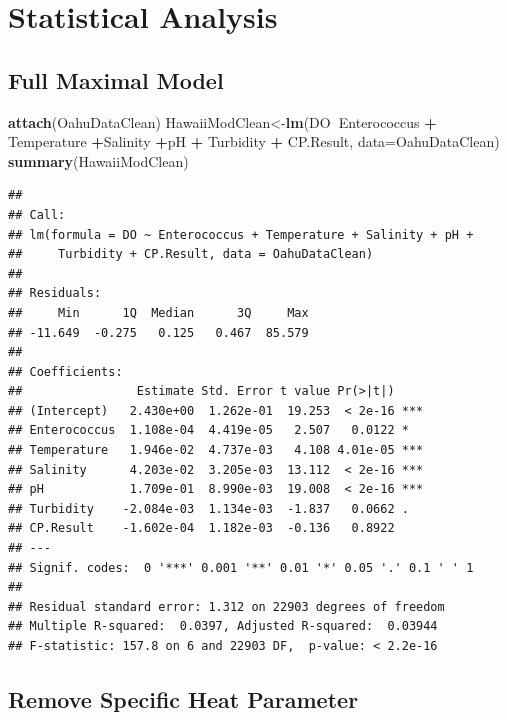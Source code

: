 \documentclass[12pt,]{article}
\newenvironment{Shaded}{\begin{snugshade}}{\end{snugshade}}
\newcommand{\KeywordTok}[1]{\textcolor[rgb]{0.13,0.29,0.53}{\textbf{#1}}}
\newcommand{\DataTypeTok}[1]{\textcolor[rgb]{0.13,0.29,0.53}{#1}}
\newcommand{\StringTok}[1]{\textcolor[rgb]{0.31,0.60,0.02}{#1}}
\newcommand{\OperatorTok}[1]{\textcolor[rgb]{0.81,0.36,0.00}{\textbf{#1}}}
\newcommand{\NormalTok}[1]{#1}
\begin{document}
\newpage

\section{Statistical Analysis}\label{statistical-analysis}

\subsection{Full Maximal Model}\label{full-maximal-model}

\begin{Shaded}
\begin{Highlighting}[]
\KeywordTok{attach}\NormalTok{(OahuDataClean)}
\NormalTok{HawaiiModClean<-}\KeywordTok{lm}\NormalTok{(DO}\OperatorTok{~}\NormalTok{Enterococcus }\OperatorTok{+}\StringTok{ }\NormalTok{Temperature }\OperatorTok{+}\NormalTok{Salinity }\OperatorTok{+}\NormalTok{pH }\OperatorTok{+}\StringTok{ }\NormalTok{Turbidity }\OperatorTok{+}\StringTok{ }\NormalTok{CP.Result, }\DataTypeTok{data=}\NormalTok{OahuDataClean)}
\KeywordTok{summary}\NormalTok{(HawaiiModClean)}
\end{Highlighting}
\end{Shaded}

\begin{verbatim}
## 
## Call:
## lm(formula = DO ~ Enterococcus + Temperature + Salinity + pH + 
##     Turbidity + CP.Result, data = OahuDataClean)
## 
## Residuals:
##     Min      1Q  Median      3Q     Max 
## -11.649  -0.275   0.125   0.467  85.579 
## 
## Coefficients:
##                Estimate Std. Error t value Pr(>|t|)    
## (Intercept)   2.430e+00  1.262e-01  19.253  < 2e-16 ***
## Enterococcus  1.108e-04  4.419e-05   2.507   0.0122 *  
## Temperature   1.946e-02  4.737e-03   4.108 4.01e-05 ***
## Salinity      4.203e-02  3.205e-03  13.112  < 2e-16 ***
## pH            1.709e-01  8.990e-03  19.008  < 2e-16 ***
## Turbidity    -2.084e-03  1.134e-03  -1.837   0.0662 .  
## CP.Result    -1.602e-04  1.182e-03  -0.136   0.8922    
## ---
## Signif. codes:  0 '***' 0.001 '**' 0.01 '*' 0.05 '.' 0.1 ' ' 1
## 
## Residual standard error: 1.312 on 22903 degrees of freedom
## Multiple R-squared:  0.0397, Adjusted R-squared:  0.03944 
## F-statistic: 157.8 on 6 and 22903 DF,  p-value: < 2.2e-16
\end{verbatim}

\subsection{Remove Specific Heat
Parameter}\label{remove-specific-heat-parameter}
\end{document}
